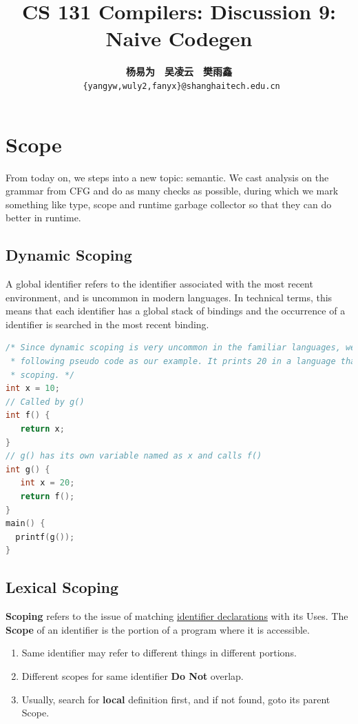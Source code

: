 \documentclass[a4paper]{article}
\title{CS 131 Compilers: Discussion 9: Naive Codegen}
\author{\textbf{杨易为}~~\textbf{吴凌云}~~\textbf{樊雨鑫} \\ \texttt{ \{yangyw,wuly2,fanyx\}@shanghaitech.edu.cn}}
\theoremstyle{definition}
\begin{document}
\maketitle
\section{Scope}
From today on, we steps into a new topic: semantic. We cast analysis on the grammar from CFG and do as many checks as possible, during which we mark something like type, scope and runtime garbage collector so that they can do better in runtime.
\subsection{Dynamic Scoping}
A global identifier refers to the identifier associated with the most recent environment, and is uncommon in modern languages. In technical terms, this means that each identifier has a global stack of bindings and the occurrence of a identifier is searched in the most recent binding.

\begin{lstlisting}[language=C]
/* Since dynamic scoping is very uncommon in the familiar languages, we consider the 
 * following pseudo code as our example. It prints 20 in a language that uses dynamic
 * scoping. */ 
int x = 10;
// Called by g()
int f() {
   return x;
} 
// g() has its own variable named as x and calls f()
int g() {
   int x = 20;
   return f();
}
main() {
  printf(g());
}
\end{lstlisting}
\subsection{Lexical Scoping}

\textbf{Scoping} refers to the issue of matching \href{https://docs.python.org/zh-cn/3.9/reference/compound_stmts.html#class-definitions}{identifier declarations} with its Uses. The \textbf{Scope} of an identifier is the portion of a program where it is accessible.
\begin{enumerate}
  \item Same identifier may refer to different things in different portions.
  \item Different scopes for same identifier \textbf{Do Not} overlap.
  \item Usually, search for \textbf{local} definition first, and if not found, goto its parent Scope.
\end{enumerate} 
\end{document}
